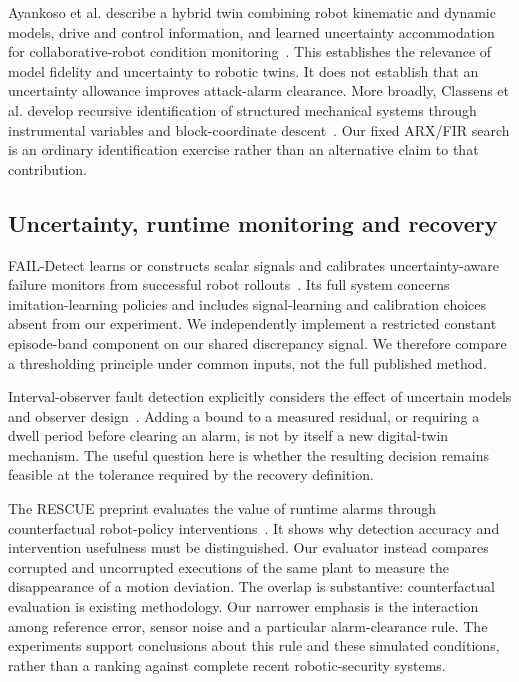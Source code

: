\documentclass[11pt]{article}
\begin{document}
Ayankoso et al. describe a hybrid twin combining robot kinematic and dynamic models, drive and control information, and learned uncertainty accommodation for collaborative-robot condition monitoring~\cite{hybrid}. This establishes the relevance of model fidelity and uncertainty to robotic twins. It does not establish that an uncertainty allowance improves attack-alarm clearance. More broadly, Classens et al. develop recursive identification of structured mechanical systems through instrumental variables and block-coordinate descent~\cite{identification}. Our fixed ARX/FIR search is an ordinary identification exercise rather than an alternative claim to that contribution.

\subsection{Uncertainty, runtime monitoring and recovery}
FAIL-Detect learns or constructs scalar signals and calibrates uncertainty-aware failure monitors from successful robot rollouts~\cite{fail}. Its full system concerns imitation-learning policies and includes signal-learning and calibration choices absent from our experiment. We independently implement a restricted constant episode-band component on our shared discrepancy signal. We therefore compare a thresholding principle under common inputs, not the full published method.

Interval-observer fault detection explicitly considers the effect of uncertain models and observer design~\cite{interval}. Adding a bound to a measured residual, or requiring a dwell period before clearing an alarm, is not by itself a new digital-twin mechanism. The useful question here is whether the resulting decision remains feasible at the tolerance required by the recovery definition.

The RESCUE preprint evaluates the value of runtime alarms through counterfactual robot-policy interventions~\cite{rescue}. It shows why detection accuracy and intervention usefulness must be distinguished. Our evaluator instead compares corrupted and uncorrupted executions of the same plant to measure the disappearance of a motion deviation. The overlap is substantive: counterfactual evaluation is existing methodology. Our narrower emphasis is the interaction among reference error, sensor noise and a particular alarm-clearance rule. The experiments support conclusions about this rule and these simulated conditions, rather than a ranking against complete recent robotic-security systems.
\end{document}
